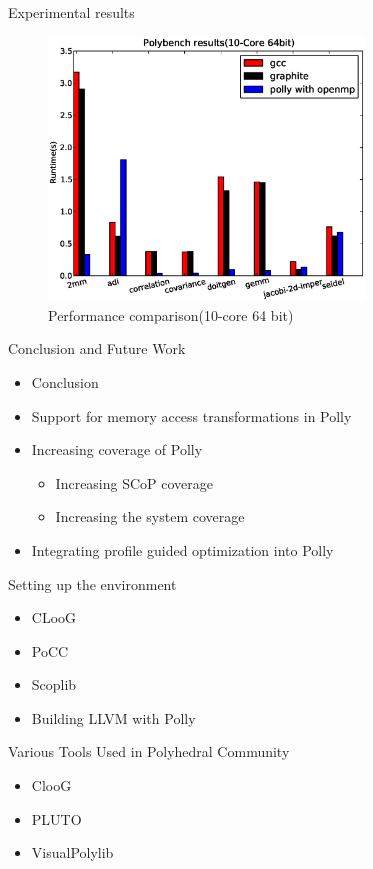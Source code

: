 \documentclass{beamer}
\begin{document}
\begin{frame}[allowframebreaks]{Experimental results}
\begin{figure}
\begin{center}
  \includegraphics[height=7cm]{images/10core64bit.eps}
  \caption{Performance comparison(10-core 64 bit)}
  \label{fig:10core}
\end{center}
\end{figure}
\end{frame}

\begin{frame}{Conclusion and Future Work}
\begin{itemize}
\item Conclusion
\item Support for memory access transformations in Polly
\item Increasing coverage of Polly
	\begin{itemize}
	\item Increasing SCoP coverage
	\item Increasing the system coverage
	\end{itemize}
\item Integrating profile guided optimization into Polly
\end{itemize}
\end{frame}

\begin{frame}{Setting up the environment}
\begin{itemize}
\item CLooG
\item PoCC
\item Scoplib
\item Building LLVM with Polly
\end{itemize}
\end{frame}

\begin{frame}{Various Tools Used in Polyhedral Community}
\begin{itemize}
\item ClooG
\item PLUTO
\item VisualPolylib
\end{itemize}
\end{frame}
\end{document}

